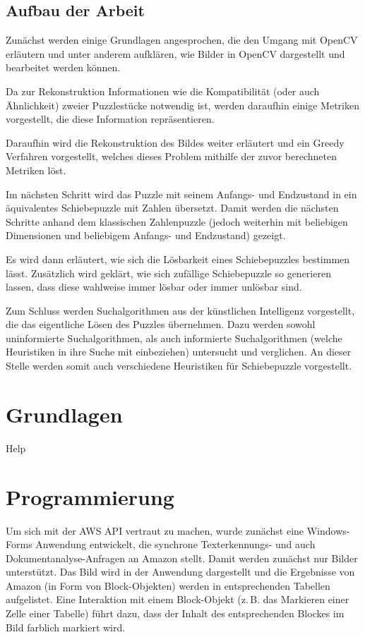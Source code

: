 \documentclass{whswinvcbook}
\begin{document}
\section{Aufbau der Arbeit}
Zunächst werden einige Grundlagen angesprochen, die den Umgang mit OpenCV erläutern und unter anderem aufklären, wie Bilder in OpenCV dargestellt und bearbeitet werden können.

Da zur Rekonstruktion Informationen wie die Kompatibilität (oder auch Ähnlichkeit) zweier Puzzlestücke notwendig ist, werden daraufhin einige Metriken vorgestellt, die diese Information repräsentieren.

Daraufhin wird die Rekonstruktion des Bildes weiter erläutert und ein Greedy Verfahren vorgestellt, welches dieses Problem mithilfe der zuvor berechneten Metriken löst.

Im nächsten Schritt wird das Puzzle mit seinem Anfangs- und Endzustand in ein äquivalentes Schiebepuzzle mit Zahlen übersetzt. Damit werden die nächsten Schritte anhand dem klassischen Zahlenpuzzle (jedoch weiterhin mit beliebigen Dimensionen und beliebigem Anfangs- und Endzustand) gezeigt.

Es wird dann erläutert, wie sich die Lösbarkeit eines Schiebepuzzles bestimmen lässt. Zusätzlich wird geklärt, wie sich zufällige Schiebepuzzle so generieren lassen, dass diese wahlweise immer lösbar oder immer unlösbar sind.

Zum Schluss werden Suchalgorithmen aus der künstlichen Intelligenz vorgestellt, die das eigentliche Lösen des Puzzles übernehmen. Dazu werden sowohl uninformierte Suchalgorithmen, als auch informierte Suchalgorithmen (welche Heuristiken in ihre Suche mit einbeziehen) untersucht und verglichen. An dieser Stelle werden somit auch verschiedene Heuristiken für Schiebepuzzle vorgestellt.
\chapter{Grundlagen}
Help
\chapter{Programmierung}
Um sich mit der AWS API vertraut zu machen, wurde zunächst eine Windows-Forms Anwendung entwickelt, die synchrone Texterkennungs- und auch Dokumentanalyse-Anfragen an Amazon stellt. Damit werden zunächst nur Bilder unterstützt. Das Bild wird in der Anwendung dargestellt und die Ergebnisse von Amazon (in Form von Block-Objekten) werden in entsprechenden Tabellen aufgelistet. Eine Interaktion mit einem Block-Objekt (z.\,B. das Markieren einer Zelle einer Tabelle) führt dazu, dass der Inhalt des entsprechenden Blockes im Bild farblich markiert wird.
\end{document}
